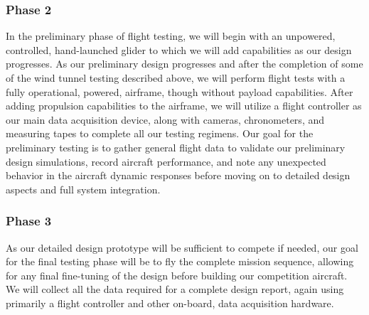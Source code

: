 \subsubsection{Phase 2} In the preliminary phase of flight testing, we will begin with an unpowered, controlled, hand-launched glider to which we will add capabilities as our design progresses.  As our preliminary design progresses and after the completion of some of the wind tunnel testing described above, we will perform flight tests with a fully operational, powered, airframe, though without payload capabilities.  After adding propulsion capabilities to the airframe, we will utilize a flight controller as our main data acquisition device,  along with cameras, chronometers, and measuring tapes to complete all our testing regimens.
Our goal for the preliminary testing is to gather general flight data to validate our preliminary design simulations, record aircraft performance, and note any unexpected behavior in the aircraft dynamic responses before moving on to detailed design aspects and full system integration.

\subsubsection{Phase 3} As our detailed design prototype will be sufficient to compete if needed, our goal for the final testing phase will be to fly the complete mission sequence, allowing for any final fine-tuning of the design before building our competition aircraft. We will collect all the data required for a complete design report, again using primarily a flight controller and other on-board, data acquisition hardware.
